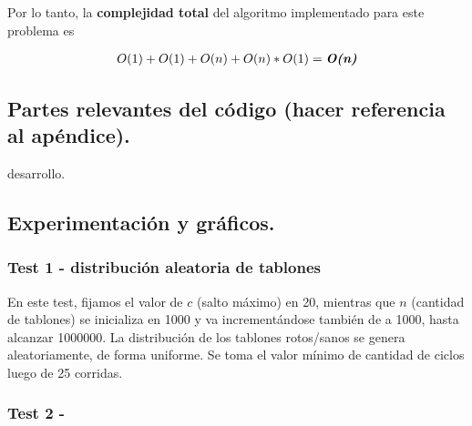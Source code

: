 Por lo tanto, la \textbf{complejidad total} del algoritmo implementado para este problema es

\begin{align*}
  O(1) + O(1) + O(n) + O(n)*O(1) = \textit{\textbf{O(n)}}
\end{align*}



\subsection{Partes relevantes del código (hacer referencia al apéndice).}

\vspace*{0.3cm}

desarrollo.



\subsection{Experimentación y gráficos.}

\vspace*{0.3cm}

\subsubsection{Test 1 - distribución aleatoria de tablones}

En este test, fijamos el valor de $c$ (salto máximo) en 20, mientras que $n$ (cantidad de tablones) 
se inicializa en 1000 y va incrementándose también de a 1000, hasta alcanzar 1000000. La 
distribución de los tablones rotos/sanos se genera aleatoriamente, de forma uniforme. 
Se toma el valor mínimo de cantidad de ciclos luego de 25 corridas. 


\vspace*{0.5cm}


\subsubsection{Test 2 - }


